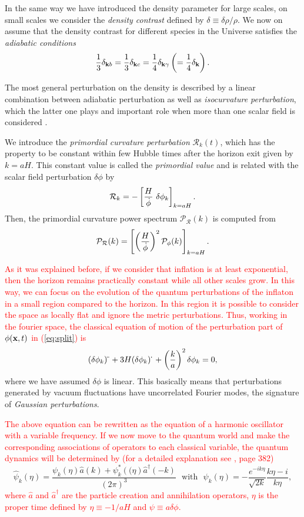 \documentclass{rmaa}
\def\beq{\begin{equation}}
\def\eeq{\end{equation}}
\def\cal{\mathcal}
\begin{document}
In the same way we have introduced the density parameter for large scales, on small scales
we consider the \textit{density contrast} defined by $\delta \equiv \delta \rho / \rho$.
We now on assume that the density contrast for different species in the Universe satisfies the 
\textit{adiabatic conditions}
 \beq
 {1 \over 3}\delta_{{\bf k} b}={1 \over 3}\delta_{{\bf k} c}={1 \over 4}\delta_{{\bf k} \gamma}
 \left(={1 \over 4}\delta_{{\bf k} }\right).
 \eeq 

\noindent
The most general perturbation on the density is described by a linear combination between adiabatic
perturbation as well as \textit{isocurvature perturbation}, which the latter one plays and important role 
when more than one scalar field is considered  \citep{LiddleLyth}.


We introduce the \textit{primordial curvature perturbation} $\mathcal{R}_k(t)$, which has the property 
to be constant within few Hubble times after the horizon exit given by $k=aH$.  
This constant value is called the
\textit{primordial value} and is related with the scalar field perturbation $\delta \phi$ by
\beq
\mathcal{R}_k=-\left[ {H \over \dot \phi}\,\, \delta \phi_k \right]_{k=aH}.
\eeq
%
\noindent
 Then, the  primordial curvature power spectrum $\cal P_{\cal R}(k)$ is computed from
 \beq\label{eq:Pk1}
 \cal P_{\cal R}(k)=\left[\left({H \over \dot \phi} \right)^2 \cal P_{\phi}(k) \right]_{k=aH}.
 \eeq
 
 \noindent
 \textcolor{red}{As it was explained before, if we consider that inflation is at least exponential, 
 then the horizon remains practically constant while all other scales grow. In this way, 
 we can focus on the evolution of the quantum perturbations of the inflaton in a small 
 region compared to the horizon. In this region it is possible to consider the space as 
 locally flat and ignore the metric perturbations. Thus, working in the fourier space, the 
 classical equation of motion of the perturbation part of $\phi({\bf x},t)$ in (\ref{eq:split}) is} 
\beq
(\delta \phi_k)\ddot \,\,+3 H (\delta \phi_k)\dot \,\,+\left({k \over a}\right)^2 \delta \phi_k=0,
\eeq
%
where we have assumed $\delta \phi$ is linear. This basically means that perturbations generated by
vacuum fluctuations have uncorrelated Fourier modes, the signature of \textit{Gaussian perturbations}. 
%

\textcolor{red}{The above equation can be rewritten as the equation of a harmonic oscillator 
with a variable frequency. If we now move to the quantum world and make the corresponding 
associations of operators to each classical variable, the quantum dynamics will be determined 
by (for a detailed explanation see \citep{LiddleLyth2}, page 382)}
\begin{equation}\label{qscalarfield}
\hat{\psi}_k\left(\eta\right)=\frac{\psi_k\left(\eta\right)\hat{a}\left(k\right)+\psi^*_k\left((\eta\right)\hat{a}^\dagger\left(-k\right)}{\left(2\pi\right)^3} \ \ \ \text{with} \ \ \ \psi_k\left(\eta\right)=-\frac{e^{-ik\eta}}{\sqrt{2k}}\frac{k\eta-i}{k\eta},
\end{equation}
\textcolor{red}{where $\hat{a}$ and $\hat{a}^\dagger$ are the particle creation and annihilation 
operators, $\eta$ is the proper time defined by $\eta\equiv -1/aH$ and $\psi\equiv a\delta\phi$.}
\end{document}

